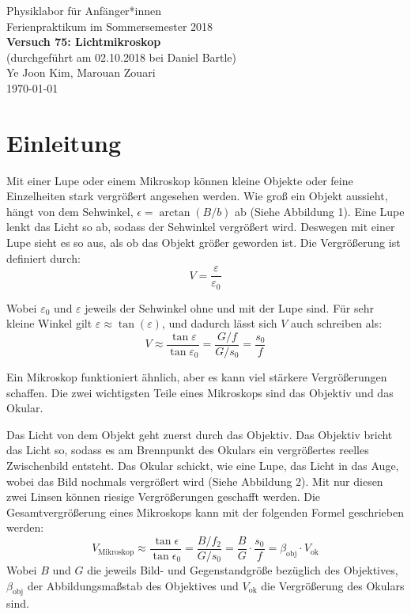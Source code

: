 \documentclass[11pt,a4paper]{article}
\begin{document}
	
	{
		\centering 
		\large 
		Physiklabor für Anfänger*innen \\
		Ferienpraktikum im Sommersemester 2018 \\[4mm]
		\textbf{\LARGE 
			Versuch 75: Lichtmikroskop
		} \\[3mm]
		(durchgeführt am 02.10.2018 bei Daniel Bartle) \\
		Ye Joon Kim, Marouan Zouari\\
		\today \\[10mm]
	}
	\tableofcontents
\newpage
\section{Einleitung}
Mit einer Lupe oder einem Mikroskop können kleine Objekte oder feine Einzelheiten stark vergrößert angesehen werden. Wie groß ein Objekt aussieht, hängt von dem Sehwinkel, $\epsilon =\arctan(B/b)$ ab (Siehe Abbildung 1). Eine Lupe lenkt das Licht so ab, sodass der Sehwinkel vergrößert wird. Deswegen mit einer Lupe sieht es so aus, als ob das Objekt größer geworden ist. Die Vergrößerung ist definiert durch:
\begin{equation}
V = \frac{\varepsilon}{\varepsilon_0}
\end{equation}

Wobei $\varepsilon_0$ und $\varepsilon$ jeweils der Sehwinkel ohne und mit der Lupe sind. Für sehr kleine Winkel gilt $\varepsilon \approx \tan(\varepsilon)$, und dadurch lässt sich $V$ auch schreiben als:
\begin{equation}
V \approx \frac{\tan\varepsilon}{\tan\varepsilon_0} = \frac{G/f}{G/s_0} = \frac{s_0}{f}
\end{equation}

Ein Mikroskop funktioniert ähnlich, aber es kann viel stärkere Vergrößerungen schaffen. Die zwei wichtigsten Teile eines Mikroskops sind das Objektiv und das Okular. 

Das Licht von dem Objekt geht zuerst durch das Objektiv. Das Objektiv bricht das Licht so, sodass es am Brennpunkt des Okulars ein vergrößertes reelles Zwischenbild entsteht. Das Okular schickt, wie eine Lupe, das Licht in das Auge, wobei das Bild nochmals vergrößert wird (Siehe Abbildung 2). Mit nur diesen zwei Linsen können riesige Vergrößerungen geschafft werden. Die Gesamtvergrößerung eines Mikroskops kann mit der folgenden Formel geschrieben werden:
\begin{equation}
V_\textrm{Mikroskop} \approx \frac{\tan\epsilon}{\tan\epsilon_0}= \frac{B/f_2}{G/s_0} = \frac{B}{G}\cdot\frac{s_0}{f} = \beta_\textrm{obj}\cdot V_\textrm{ok}
\end{equation}
Wobei $B$ und $G$ die jeweils Bild- und Gegenstandgröße bezüglich des Objektives, $\beta_\textrm{obj}$ der Abbildungsmaßstab des Objektives und $V_\textrm{ok}$ die Vergrößerung des Okulars sind. 
\end{document}
